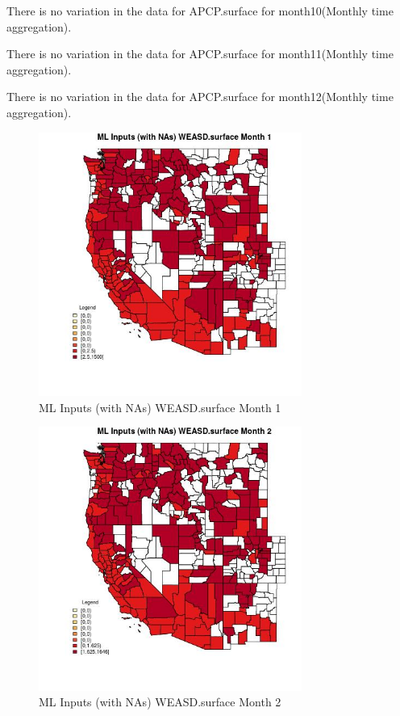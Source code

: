There is no variation in the data for APCP.surface for month10(Monthly time aggregation). 
 

There is no variation in the data for APCP.surface for month11(Monthly time aggregation). 
 

There is no variation in the data for APCP.surface for month12(Monthly time aggregation). 
 

\begin{figure} 
\centering  
\includegraphics[width=0.77\textwidth]{Code_Outputs/Report_ML_input_PM25_Step4_part_f_de_duplicated_aves_prioritize_24hr_obswNAs_CountyWEASDsurfacemedianMonth1.jpg} 
\caption{\label{fig:Report_ML_input_PM25_Step4_part_f_de_duplicated_aves_prioritize_24hr_obswNAsCountyWEASDsurfacemedianMonth1}ML Inputs (with NAs) WEASD.surface Month 1} 
\end{figure} 
 

\begin{figure} 
\centering  
\includegraphics[width=0.77\textwidth]{Code_Outputs/Report_ML_input_PM25_Step4_part_f_de_duplicated_aves_prioritize_24hr_obswNAs_CountyWEASDsurfacemedianMonth2.jpg} 
\caption{\label{fig:Report_ML_input_PM25_Step4_part_f_de_duplicated_aves_prioritize_24hr_obswNAsCountyWEASDsurfacemedianMonth2}ML Inputs (with NAs) WEASD.surface Month 2} 
\end{figure} 
 

